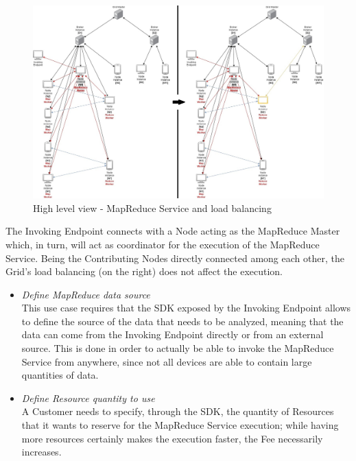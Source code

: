 \begin{itemize}
\begin{itemize}
        \begin{figure}[!ht]
            \centering
            \includegraphics[width=\linewidth]{document/chapters/chapter_5/images/mapreduce_load_balancing.jpg}
            \caption{High level view - MapReduce Service and load balancing}
            \label{fig:mapreduce_load_balancing}
        \end{figure}

        The Invoking Endpoint connects with a Node acting as the MapReduce Master which, in turn, will act as coordinator for the execution of the MapReduce Service. Being the Contributing Nodes directly connected among each other, the Grid's load balancing (on the right) does not affect the execution.


        \begin{itemize}
            \item \textit{Define MapReduce data source}\\
            This use case requires that the SDK exposed by the Invoking Endpoint allows to define the source of the data that needs to be analyzed, meaning that the data can come from the Invoking Endpoint directly or from an external source. This is done in order to actually be able to invoke the MapReduce Service from anywhere, since not all devices are able to contain large quantities of data.

            \item \textit{Define Resource quantity to use}\\
            A Customer needs to specify, through the SDK, the quantity of Resources that it wants to reserve for the MapReduce Service execution; while having more resources certainly makes the execution faster, the Fee necessarily increases.


\end{itemize}
\end{itemize}
\end{itemize}
